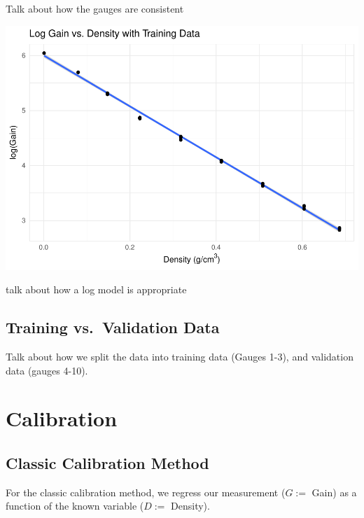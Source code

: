 \documentclass[]{article}
\begin{document}
Talk about how the gauges are consistent

\includegraphics{Project_05_files/figure-latex/Training Data-1.pdf}

talk about how a log model is appropriate

\subsection{Training vs.~Validation
Data}\label{training-vs.validation-data}

Talk about how we split the data into training data (Gauges 1-3), and
validation data (gauges 4-10).

\section{Calibration}\label{calibration}

\subsection{Classic Calibration
Method}\label{classic-calibration-method}

For the classic calibration method, we regress our measurement (\(G:=\)
Gain) as a function of the known variable (\(D:=\) Density).
\end{document}
